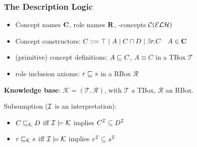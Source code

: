 \documentclass[smaller, dvipsnames]{beamer}
\begin{document}
\begin{frame}
  \frametitle{The \elh{} Description Logic}
  \begin{block}{\elh}
    \begin{itemize}
      \item Concept names \(\mathbf{C}\), role names \(\mathbf{R}\), \elh-concepts \(\mathcal{C}(\mathcal{ELH})\)
      \item \alert{Concept constructors}: \(C ::= \top \mid A \mid C \sqcap D \mid \exists{}r.C \quad A \in \mathbf{C}\)
      \item (primitive) \alert{concept definitions}: \(A \sqsubseteq_{\mathcal{}} C\), \(A \equiv C\) in a \alert{TBox} \(\mathcal{T}\)
      \item \alert{role inclusion axioms}: \(r \sqsubseteq_{\mathcal{}} s\) in a \alert{RBox} \(\mathcal{R}\)
    \end{itemize}
  \end{block}
  \onslide<+->
  \textbf{Knowledge base}: \(\mathcal{K} = (\mathcal{T}, \mathcal{R})\), with \(\mathcal{T}\) a TBox, \(\mathcal{R}\) an RBox.
  
  \alert{Subsumption} (\(\mathcal{I}\) is an interpretation):
  \begin{itemize}
    \item \(C \sqsubseteq_{\mathcal{K}} D\) iff \(\mathcal{I} \models \mathcal{K}\) implies \(C^{\mathcal{I}} \subseteq D^{\mathcal{I}}\)
    \item \(r \sqsubseteq_{\mathcal{K}} s\) iff \(\mathcal{I} \models \mathcal{K}\) implies \(r^{\mathcal{I}} \subseteq s^{\mathcal{I}}\)
  \end{itemize}
\end{frame}
\end{document}
